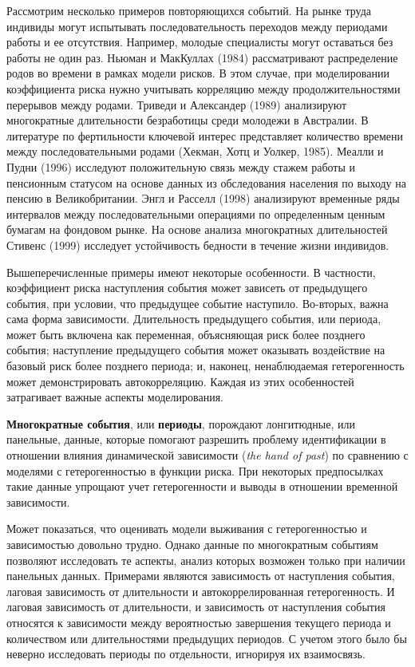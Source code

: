 Рассмотрим несколько примеров повторяющихся событий. На рынке труда индивиды могут испытывать последовательность переходов между периодами работы и ее отсутствия. Например, молодые специалисты могут оставаться без работы не один раз. Ньюман и МакКуллах (1984) рассматривают распределение родов во времени в рамках модели рисков. В этом случае, при моделировании коэффициента риска нужно учитывать корреляцию между продолжительностями перерывов между родами. Триведи и Александер (1989) анализируют многократные длительности безработицы среди молодежи в Австралии. В литературе по фертильности ключевой интерес представляет количество времени между последовательными родами (Хекман, Хотц и Уолкер, 1985). Меалли и Пудни (1996) исследуют положительную связь между стажем работы и пенсионным статусом на основе данных из обследования населения по выходу на пенсию в Великобритании. Энгл и Расселл (1998) анализируют временные ряды интервалов между последовательными операциями по определенным ценным бумагам на фондовом рынке. На основе анализа многократных длительностей Стивенс (1999) исследует устойчивость бедности в течение жизни индивидов.

Вышеперечисленные примеры имеют некоторые особенности. В частности, коэффициент риска наступления события может зависеть от предыдущего события, при условии, что предыдущее событие наступило. Во-вторых, важна сама форма зависимости. Длительность предыдущего события, или периода, может быть включена как переменная, объясняющая риск более позднего события; наступление предыдущего события может оказывать воздействие на базовый риск более позднего периода; и, наконец, ненаблюдаемая гетерогенность может демонстрировать автокорреляцию.
Каждая из этих особенностей затрагивает важные аспекты моделирования.

\textbf{Многократные события}, или \textbf{периоды}, порождают лонгитюдные, или панельные, данные, которые помогают разрешить проблему идентификации в отношении влияния динамической зависимости (\textit{the hand of past}) по сравнению с моделями с гетерогенностью в функции риска. При некоторых предпосылках такие данные упрощают учет гетерогенности и выводы в отношении временной зависимости.

Может показаться, что оценивать модели выживания с гетерогенностью и зависимостью довольно трудно. Однако данные по многократным событиям позволяют исследовать те аспекты, анализ которых возможен только при наличии панельных данных. Примерами являются зависимость от наступления события, лаговая зависимость от длительности и автокоррелированная гетерогенность. И лаговая зависимость от длительности, и зависимость от наступления события относятся к зависимости между вероятностью завершения текущего периода и количеством или длительностями предыдущих периодов. С учетом этого было бы неверно исследовать периоды по отдельности, игнорируя их взаимосвязь.

